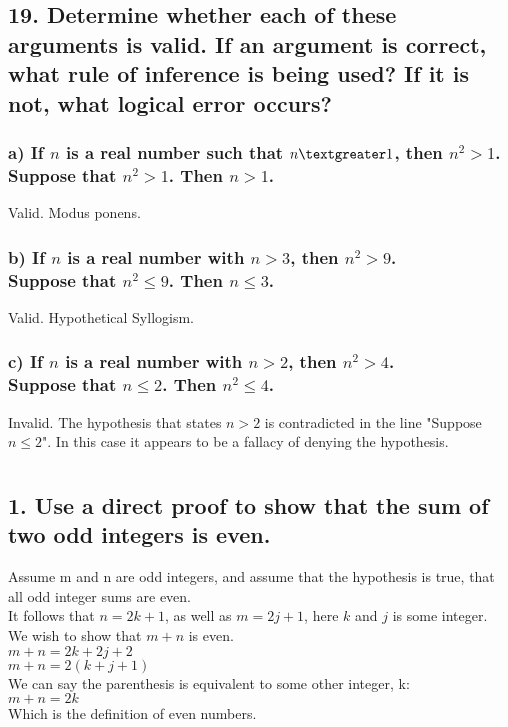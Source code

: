 \documentclass[11pt, oneside]{article} %
\numberwithin{equation}{section} %
\numberwithin{figure}{section} %
\numberwithin{table}{section} %
\begin{document}
\subsection{19. Determine whether each of these arguments is valid. If an argument is correct, what rule of inference is being used? If it is not, what logical error occurs?}
\subsubsection{a) If $n$ is a real number such that $n \textgreater 1$, then $n^2 > 1$.\\
Suppose that $n^2 > 1$. Then $n > 1$.}
Valid. Modus ponens.
\subsubsection{b) If $n$ is a real number with $n>3$, then $n^2 > 9$.\\
Suppose that $n^2 \leq 9$. Then $n \leq 3$.}
Valid. Hypothetical Syllogism.
\subsubsection{c) If $n$ is a real number with $n>2$, then $n^2 > 4$. \\
Suppose that $n \leq 2$. Then $n^2 \leq 4$.}
Invalid. The hypothesis that states $n>2$ is contradicted in the line "Suppose $n \leq 2$". In this case it appears to be a fallacy of denying the hypothesis.


\section{}
\subsection{1. Use a direct proof to show that the sum of two odd integers is even.}
Assume m and n are odd integers, and assume that the hypothesis is true, that all odd integer sums are even.\\
It follows that $n = 2k + 1$, as well as $m = 2j + 1$, here $k$ and $j$ is some integer. \\
We wish to show that $m + n$ is even. \\
$m + n = 2k + 2j + 2$ \\
$m + n = 2(k + j + 1)$ \\
We can say the parenthesis is equivalent to some other integer, k: \\
$m + n = 2k$ \\
Which is the definition of even numbers.
\end{document}
